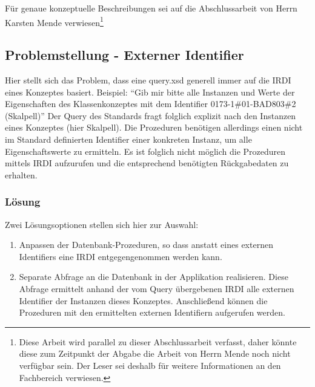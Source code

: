 Für genaue konzeptuelle Beschreibungen sei auf die Abschlussarbeit von Herrn Karsten Mende verwiesen\footnote{Diese Arbeit wird parallel zu dieser Abschlussarbeit verfasst, daher könnte diese zum Zeitpunkt der Abgabe die Arbeit von Herrn Mende noch nicht verfügbar sein. Der Leser sei deshalb für weitere Informationen an den Fachbereich verwiesen.}

\subsection{Problemstellung - Externer Identifier}\label{sec:problemidentifier}

Hier stellt sich das Problem, dass eine query.xsd generell immer auf die \gls{IRDI} eines Konzeptes basiert. 
Beispiel: \enquote{Gib mir bitte alle Instanzen und Werte der Eigenschaften des Klassenkonzeptes mit dem Identifier 0173-1\#01-BAD803\#2 (Skalpell)}
Der Query des Standards fragt folglich explizit nach den Instanzen eines Konzeptes (hier Skalpell). Die Prozeduren benötigen allerdings einen nicht im Standard definierten Identifier einer konkreten Instanz, um alle Eigenschaftswerte zu ermitteln. Es ist folglich nicht möglich die Prozeduren mittels \gls{IRDI} aufzurufen und die entsprechend benötigten Rückgabedaten zu erhalten. 

\subsubsection{Lösung}

Zwei Lösungsoptionen stellen sich hier zur Auswahl:
\begin{enumerate}
\item Anpassen der Datenbank-Prozeduren, so dass anstatt eines externen Identifiers eine \gls{IRDI} entgegengenommen werden kann.
\item Separate Abfrage an die Datenbank in der Applikation realisieren. Diese Abfrage ermittelt anhand der vom Query übergebenen \gls{IRDI} alle externen Identifier der Instanzen dieses Konzeptes. Anschließend können die Prozeduren mit den ermittelten externen Identifiern aufgerufen werden.   
\end{enumerate}

